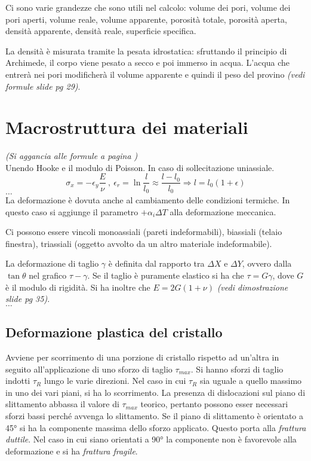 \documentclass[a5paper,12pt]{article}
\begin{document}
Ci sono varie grandezze che sono utili nel calcolo: volume dei pori, volume dei pori aperti, volume reale, volume apparente, porosità totale, porosità aperta, densità apparente, densità reale, superficie specifica.

La densità è misurata tramite la pesata idrostatica: sfruttando il principio di Archimede, il corpo viene pesato a secco e poi immerso in acqua. L'acqua che entrerà nei pori  modificherà il volume apparente e quindi il peso del provino \textit{(vedi formule slide pg 29)}.

\section{Macrostruttura dei materiali}
\textit{(Si aggancia alle formule a pagina \pageref{poisson})}\\
Unendo Hooke e il modulo di Poisson. In caso di sollecitazione uniassiale. \[\sigma_x = -\epsilon_y \frac{E}{\nu} \: , \: \epsilon_r = \ln{\frac{l}{l_0}} \approx \frac{l - l_0}{l_0}\Longrightarrow l=l_0(1+\epsilon)\]
$\dots$\\
La deformazione è dovuta anche al cambiamento delle condizioni termiche. In questo caso si aggiunge il parametro $+ \alpha_i \Delta T$ alla deformazione meccanica.

Ci possono essere vincoli monoassiali (pareti indeformabili), biassiali (telaio finestra), triassiali (oggetto avvolto da un altro materiale indeformabile).

La deformazione di taglio $\gamma$ è definita dal rapporto tra $\Delta X $ e $\Delta Y$, ovvero dalla $\tan \theta$ nel grafico $\tau - \gamma$. Se il taglio è puramente elastico si ha che $\tau = G \gamma$, dove $G$ è il modulo di rigidità. Si ha inoltre che $E= 2 G(1 + \nu)$ \textit{(vedi dimostrazione slide pg 35)}.\\$\dots$
\subsection{Deformazione plastica del cristallo}
Avviene per scorrimento di una porzione di cristallo rispetto ad un'altra in seguito all'applicazione di uno sforzo di taglio $\tau_{max}$. Si hanno sforzi di taglio indotti $\tau_R$ lungo le varie direzioni. Nel caso in cui $\tau_R$ sia uguale a quello massimo in uno dei vari piani, si ha lo scorrimento. 
La presenza di dislocazioni sul piano di slittamento abbassa il valore di $\tau_{max}$ teorico, pertanto possono esser necessari sforzi bassi perché avvenga lo slittamento. Se il piano di slittamento è orientato a \ang{45} si ha la componente massima dello sforzo applicato. Questo porta alla \emph{frattura duttile}. Nel caso in cui siano orientati a \ang{90} la componente non è favorevole alla deformazione e si ha \emph{frattura fragile}.
\end{document}
